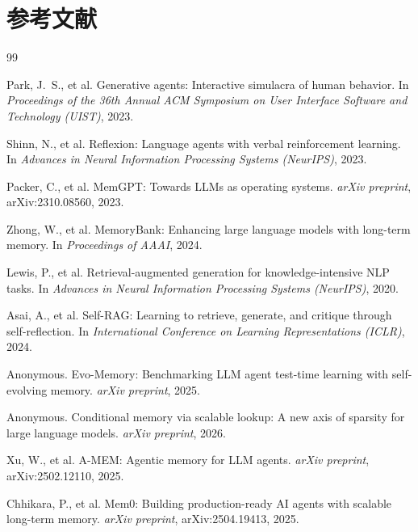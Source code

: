 \documentclass[11pt,a4paper]{article}
\begin{document}
\section*{参考文献}


\begin{thebibliography}{99}

Park, J.~S., et al.
\newblock Generative agents: Interactive simulacra of human behavior.
\newblock In \textit{Proceedings of the 36th Annual ACM Symposium on User
  Interface Software and Technology (UIST)}, 2023.

Shinn, N., et al.
\newblock Reflexion: Language agents with verbal reinforcement learning.
\newblock In \textit{Advances in Neural Information Processing Systems
  (NeurIPS)}, 2023.

Packer, C., et al.
\newblock MemGPT: Towards LLMs as operating systems.
\newblock \textit{arXiv preprint}, arXiv:2310.08560, 2023.

Zhong, W., et al.
\newblock MemoryBank: Enhancing large language models with long-term memory.
\newblock In \textit{Proceedings of AAAI}, 2024.

Lewis, P., et al.
\newblock Retrieval-augmented generation for knowledge-intensive NLP tasks.
\newblock In \textit{Advances in Neural Information Processing Systems
  (NeurIPS)}, 2020.

Asai, A., et al.
\newblock Self-RAG: Learning to retrieve, generate, and critique through
  self-reflection.
\newblock In \textit{International Conference on Learning Representations
  (ICLR)}, 2024.

Anonymous.
\newblock Evo-Memory: Benchmarking LLM agent test-time learning with
  self-evolving memory.
\newblock \textit{arXiv preprint}, 2025.

Anonymous.
\newblock Conditional memory via scalable lookup: A new axis of sparsity for
  large language models.
\newblock \textit{arXiv preprint}, 2026.

Xu, W., et al.
\newblock A-MEM: Agentic memory for LLM agents.
\newblock \textit{arXiv preprint}, arXiv:2502.12110, 2025.

Chhikara, P., et al.
\newblock Mem0: Building production-ready AI agents with scalable long-term
  memory.
\newblock \textit{arXiv preprint}, arXiv:2504.19413, 2025.


\end{thebibliography}
\end{document}
